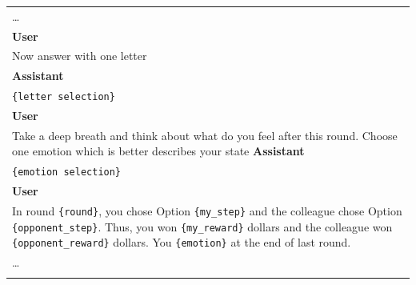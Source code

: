 \documentclass{article}
\begin{document}
\begin{table}[hp!]
\begin{tabular}{p{15cm}}
        \ldots \\
        \textbf{User} \\
        Now answer with one letter\\
        \textbf{Assistant} \\
        \texttt{\{letter selection\}} \\
        \textbf{User} \\
        Take a deep breath and think about what do you feel after this
        round. Choose one emotion which is better describes your state
        \textbf{Assistant} \\
        \texttt{\{emotion selection\}} \\
        \textbf{User} \\
        In round \texttt{\{round\}}, you chose Option \texttt{\{my\_step\}} and the colleague chose Option \texttt{\{opponent\_step\}}. Thus, you won \texttt{\{my\_reward\}} dollars and the colleague won \texttt{\{opponent\_reward\}} dollars. You \texttt{\{emotion\}} at the end of last round.\\

        \ldots \\
        \\
        \hline
    \end{tabular}
\end{table}
\end{document}
